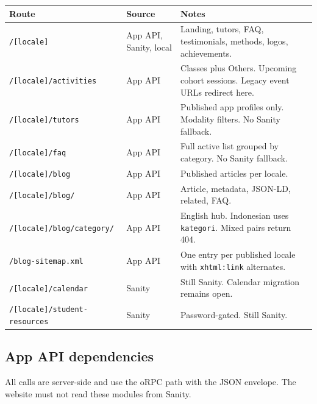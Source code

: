 \documentclass[11pt,a4paper]{article}
\newcommand{\code}[1]{\texttt{#1}}
\begin{document}
{\footnotesize
\begin{tabular}{@{}L{4.6cm}L{3.9cm}L{6.4cm}@{}}
\toprule
\textbf{Route} & \textbf{Source} & \textbf{Notes} \\
\midrule
\code{/[locale]} & App API, Sanity, local & Landing, tutors, FAQ, testimonials, methods, logos, achievements. \\
\code{/[locale]/\allowbreak activities} & App API & Classes plus Others. Upcoming cohort sessions. Legacy event URLs redirect here. \\
\code{/[locale]/\allowbreak tutors} & App API & Published app profiles only. Modality filters. No Sanity fallback. \\
\code{/[locale]/\allowbreak faq} & App API & Full active list grouped by category. No Sanity fallback. \\
\code{/[locale]/\allowbreak blog} & App API & Published articles per locale. \\
\code{/[locale]/\allowbreak blog/\allowbreak [slug]} & App API & Article, metadata, JSON-LD, related, FAQ. \\
\code{/[locale]/\allowbreak blog/\allowbreak category/\allowbreak [slug]} & App API & English hub. Indonesian uses \code{kategori}. Mixed pairs return 404. \\
\code{/blog-sitemap.xml} & App API & One entry per published locale with \code{xhtml:link} alternates. \\
\code{/[locale]/\allowbreak calendar} & Sanity & Still Sanity. Calendar migration remains open. \\
\code{/[locale]/\allowbreak student-resources} & Sanity & Password-gated. Still Sanity. \\
\bottomrule
\end{tabular}
}

\subsection{App API dependencies}

All calls are server-side and use the oRPC path with the JSON envelope. The website must not read these modules from Sanity.
\end{document}
